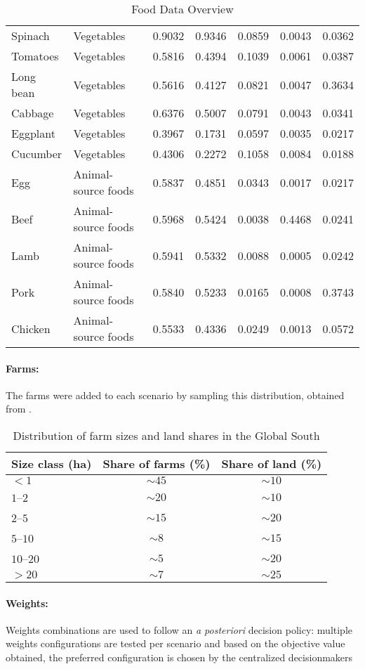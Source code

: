 \begin{table}[ht]
\begin{tabular}{llrrrrr}
Spinach        & Vegetables            & 0.9032 & 0.9346 & 0.0859 & 0.0043 & 0.0362 \\
Tomatoes       & Vegetables            & 0.5816 & 0.4394 & 0.1039 & 0.0061 & 0.0387 \\
Long bean      & Vegetables            & 0.5616 & 0.4127 & 0.0821 & 0.0047 & 0.3634 \\
Cabbage        & Vegetables            & 0.6376 & 0.5007 & 0.0791 & 0.0043 & 0.0341 \\
Eggplant       & Vegetables            & 0.3967 & 0.1731 & 0.0597 & 0.0035 & 0.0217 \\
Cucumber       & Vegetables            & 0.4306 & 0.2272 & 0.1058 & 0.0084 & 0.0188 \\
Egg            & Animal-source foods   & 0.5837 & 0.4851 & 0.0343 & 0.0017 & 0.0217 \\
Beef           & Animal-source foods   & 0.5968 & 0.5424 & 0.0038 & 0.4468 & 0.0241 \\
Lamb           & Animal-source foods   & 0.5941 & 0.5332 & 0.0088 & 0.0005 & 0.0242 \\
Pork           & Animal-source foods   & 0.5840 & 0.5233 & 0.0165 & 0.0008 & 0.3743 \\
Chicken        & Animal-source foods   & 0.5533 & 0.4336 & 0.0249 & 0.0013 & 0.0572 \\
\bottomrule
\end{tabular}
\caption{Food Data Overview}
\end{table}

\newpage
\paragraph{Farms:}

The farms were added to each scenario by sampling this distribution, obtained from \cite{LOWDER201616}.

\begin{table}[h!]
\centering

\begin{tabular}{lcc}
\toprule
\textbf{Size class (ha)} & \textbf{Share of farms (\%)} & \textbf{Share of land (\%)} \\
\midrule
$<1$        & $\sim 45$ & $\sim 10$ \\
$1$--$2$    & $\sim 20$ & $\sim 10$ \\
$2$--$5$    & $\sim 15$ & $\sim 20$ \\
$5$--$10$   & $\sim 8$  & $\sim 15$ \\
$10$--$20$  & $\sim 5$  & $\sim 20$ \\
$>20$       & $\sim 7$  & $\sim 25$ \\
\bottomrule
\end{tabular}
\caption{Distribution of farm sizes and land shares in the Global South}
\label{tab:farm_size_distribution}
\end{table}


\paragraph{Weights:}

Weights combinations are used to follow an \textit{a posteriori} decision policy: multiple weights configurations are tested per scenario and based on the objective value obtained, the preferred configuration is chosen by the centralized decisionmakers
